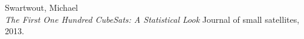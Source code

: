 \documentclass[english,12pt,a4paper,pdftex,elec,utf8]{aaltothesis}
\begin{document}
\clearpage

{}
\begin{thebibliography}{99}

 Swartwout, Michael\\
  \textit{The First One Hundred CubeSats: A Statistical Look}  Journal of small satellites, 2013.



\end{thebibliography}

\clearpage

\thesisappendix
\end{document}

